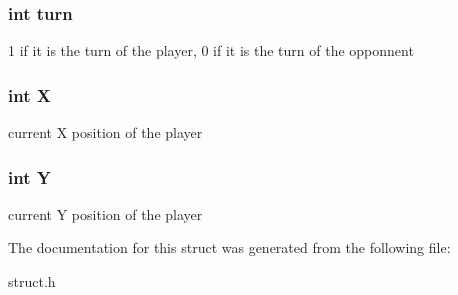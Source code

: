\subsubsection[{\texorpdfstring{turn}{turn}}]{\setlength{\rightskip}{0pt plus 5cm}int turn}\hypertarget{struct___player_aaefa47f4fdf865c2358c22b542a993e4}{}\label{struct___player_aaefa47f4fdf865c2358c22b542a993e4}
1 if it is the turn of the player, 0 if it is the turn of the opponnent 
\subsubsection[{\texorpdfstring{X}{X}}]{\setlength{\rightskip}{0pt plus 5cm}int X}\hypertarget{struct___player_a80c0944640e62d3ed6c5419c1bcc0c88}{}\label{struct___player_a80c0944640e62d3ed6c5419c1bcc0c88}
current X position of the player 
\subsubsection[{\texorpdfstring{Y}{Y}}]{\setlength{\rightskip}{0pt plus 5cm}int Y}\hypertarget{struct___player_aa482c4cc86a24474e4fb19b5b5978778}{}\label{struct___player_aa482c4cc86a24474e4fb19b5b5978778}
current Y position of the player 

The documentation for this struct was generated from the following file\+:\begin{DoxyCompactItemize}
\item 
struct.\+h\end{DoxyCompactItemize}
